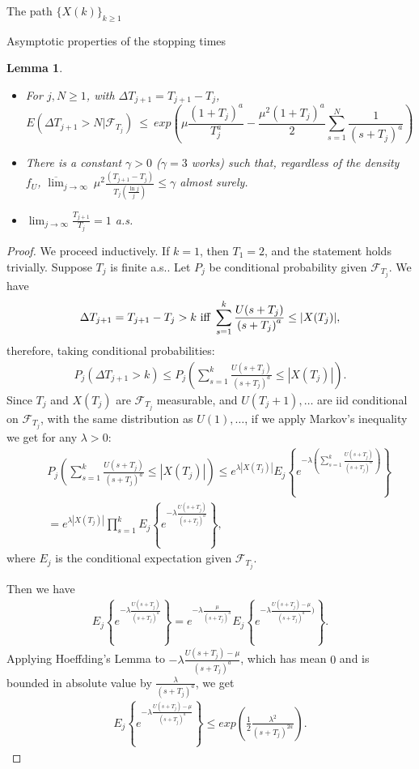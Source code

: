 \documentclass[12pt]{article}
\newtheorem{lemma}[theorem]{Lemma}
\begin{document}
\begin{section}{The path $\{X(k)\}_{k\ge1}$ }
\begin{subsection}{Asymptotic properties of the stopping times}
\begin{lemma}
\begin{itemize}
	\item[ii.] For $j,N \ge 1$, with $\Delta T_{j+1} = T_{j+1} - T_{j}$,
	$$ E\left( \Delta T_{j+1} > N | \mathcal{F}_{T_j}\right) ~\le~
	exp\left( 
	\mu  \frac{(1+T_j)^a}{T_j^a} 
	- \frac{\mu^2 (1+T_j)^a}{2} \sum_{s=1}^{N} \frac{1}{{(s+T_j)}^a}  \right)
	$$
	
	\item[iii.] There is a constant $\gamma > 0$ ($\gamma = 3$ works) such that, regardless of the density $f_U$, $\overline{\lim}_{j \rightarrow \infty } \  \mu^2 
	\frac{(T_{j+1}-T_j)}{ T_j (\frac{\ln j}{j})} \le \gamma $ almost surely.
	
	\item[iv.] $\lim_{j \rightarrow \infty} \frac{T_{j+1} }{T_j} = 1$ a.s.
\end{itemize}
\end{lemma}

\begin{proof}
 We proceed inductively. If $k=1$, then $T_1=2$, and the statement holds trivially. Suppose $T_{j}$ is finite a.s.. Let $P_{j}$ be conditional probability given $\mathcal{F}_{T_j}$. We have 
 $$
 \Delta T_{j+1} = T_{j+1} - T_{j} > k \text{ iff }\\
 \sum_{s=1}^{k} \frac{U(s+T_j)}{{(s+T_j)}^a} \le |X(T_{j})|,
 $$
 therefore, taking conditional probabilities:
 \begin{align*}
 P_j\left( \Delta T_{j+1} > k \right) \le 
 P_j\left( \sum_{s=1}^{k} \frac{U(s+T_j)}{{(s+T_j)}^a} \le |X(T_{j})| \right).
 \end{align*}
 Since $T_j$ and $X(T_j)$ are $\mathcal{F}_{T_j}$ measurable, and $U(T_j+1),\dots$ are iid conditional on $\mathcal{F}_{T_j}$, with the same distribution as $U(1),\dots$, if we apply Markov's inequality we get for any $\lambda > 0$:
 \begin{align*}
&& P_j\left( \sum_{s=1}^{k} \frac{U(s+T_j)}{{(s+T_j)}^a} \le |X(T_{j})| \right) 
 \le e^{\lambda |X(T_{j})|} 
E_j\left\{ e^{-\lambda (\sum_{s=1}^{k} \frac{U(s+T_j)}{{(s+T_j)}^a} ) }    \right\} \\
&& =  e^{\lambda |X(T_{j})|} 
 \prod_{s=1}^{k}  E_j\left\{ e^{-\lambda \frac{U(s+T_j)}{{(s+T_j)}^a}  }    \right\},
 \end{align*}
 where $E_j$ is the conditional expectation given $\mathcal{F}_{T_j}$.  
 
 Then we have
 \begin{align*}
 E_j\left\{ e^{-\lambda \frac{U(s+T_j)}{{(s+T_j)}^a} }  \right\} 
  = e^{-\lambda \frac{\mu}{{(s+T_j)}^a} } 
 E_j\left\{ e^{-\lambda \frac{U(s+T_j)-\mu}{{(s+T_j)}^a} ) } \right\}.  
 \end{align*}
Applying Hoeffding's Lemma to $-\lambda \frac{U(s+T_j)-\mu}{{(s+T_j)}^a}$, which has mean $0$ and is bounded in absolute value by $\frac{\lambda}{{(s+T_j)}^a}$, we get
\begin{align*}
E_j\left\{ e^{-\lambda \frac{U(s+T_j)-\mu}{{(s+T_j)}^a} } \right\} 
\le exp\left(  \frac{1}{2} \frac{\lambda^2}{{(s+T_j)}^{2a} }  \right) . 
\end{align*}  


\end{proof}
\end{subsection}
\end{section}
\end{document}
